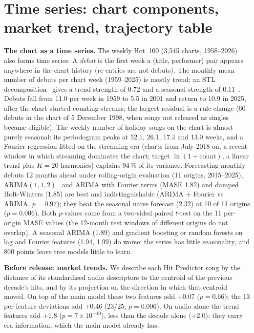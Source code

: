 \section{Time series: chart components, market trend, trajectory table}\label{app:tsdetails}
\textbf{The chart as a time series.} The weekly Hot~100 (3{,}545 charts, 1958--2026) also
forms time series. A \emph{debut} is the first week a (title, performer) pair appears anywhere in the chart
history (re-entries are not debuts). The monthly mean number of debuts per chart week (1959--2025) is mostly
trend: an STL decomposition~\cite{cleveland1990stl} gives a trend strength of 0.72 and a
seasonal strength of 0.11~\cite{hyndman2021forecasting}. Debuts fall from 11.0 per week in
1959 to 5.5 in 2001 and return to 10.9 in 2025, after the chart started counting streams;
the largest residual is a rule change (60 debuts in the chart of 5 December 1998, when
songs not released as singles became eligible). The weekly number of holiday songs on the
chart is almost purely seasonal: its periodogram peaks at 52.1, 26.1, 17.4 and 13.0 weeks,
and a Fourier regression fitted on the streaming era (charts from July 2018 on, a recent window in which streaming dominates the chart; target $\ln(1+\text{count})$, a linear trend plus $K=20$ harmonics) explains 94\,\% of
its variance. Forecasting monthly debuts 12 months ahead under rolling-origin evaluation
(11 origins, 2015--2025), ARIMA$(1,1,2)$~\cite{box2015time} and ARIMA with Fourier terms
(MASE 1.82) and damped Holt-Winters (1.85) are best and indistinguishable (ARIMA + Fourier vs ARIMA, $p=0.97$); they
beat the seasonal naive forecast (2.32) at 10 of 11 origins ($p=0.006$). Both $p$-values come from a two-sided
paired $t$-test on the 11 per-origin MASE values (the 12-month test windows of different origins do not overlap). A seasonal ARIMA
(1.89) and gradient boosting or random forests on lag and Fourier features (1.94, 1.99) do
worse: the series has little seasonality, and 800 points leave tree models little to learn.

\textbf{Before release: market trends.} We describe each Hit Predictor song by the
distance of its standardised audio descriptors to the centroid of the previous decade's
hits, and by its projection on the direction in which that centroid moved. On top of the
main model these two features add $+0.07$\pp{} ($p=0.66$); the 13 per-feature deviations add
$+0.46$\pp{} (23/25, $p=0.006$). On audio alone the trend features add $+1.8$\pp{}
($p=7\times10^{-10}$), less than the decade alone ($+2.0$\pp): they carry era information,
which the main model already has.


